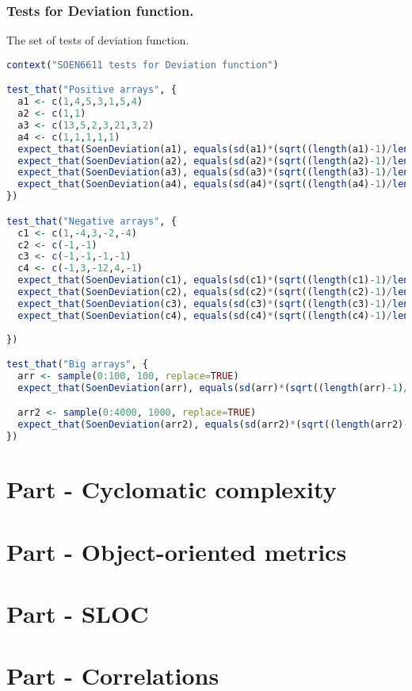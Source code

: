\documentclass[12pt]{article}
\begin{document}
\subsubsection{Tests for Deviation function.}
The set of tests of deviation function.
\begin{lstlisting}[language=R]
context("SOEN6611 tests for Deviation function")

test_that("Positive arrays", {
  a1 <- c(1,4,5,3,1,5,4)
  a2 <- c(1,1)
  a3 <- c(13,5,2,3,21,3,2)
  a4 <- c(1,1,1,1,1)
  expect_that(SoenDeviation(a1), equals(sd(a1)*(sqrt((length(a1)-1)/length(a1)))))
  expect_that(SoenDeviation(a2), equals(sd(a2)*(sqrt((length(a2)-1)/length(a2)))))
  expect_that(SoenDeviation(a3), equals(sd(a3)*(sqrt((length(a3)-1)/length(a3)))))
  expect_that(SoenDeviation(a4), equals(sd(a4)*(sqrt((length(a4)-1)/length(a4)))))
})

test_that("Negative arrays", {
  c1 <- c(1,-4,3,-2,-4)
  c2 <- c(-1,-1)
  c3 <- c(-1,-1,-1,-1)
  c4 <- c(-1,3,-12,4,-1)
  expect_that(SoenDeviation(c1), equals(sd(c1)*(sqrt((length(c1)-1)/length(c1)))))
  expect_that(SoenDeviation(c2), equals(sd(c2)*(sqrt((length(c2)-1)/length(c2)))))
  expect_that(SoenDeviation(c3), equals(sd(c3)*(sqrt((length(c3)-1)/length(c3)))))
  expect_that(SoenDeviation(c4), equals(sd(c4)*(sqrt((length(c4)-1)/length(c4)))))
  
})

test_that("Big arrays", {
  arr <- sample(0:100, 100, replace=TRUE)
  expect_that(SoenDeviation(arr), equals(sd(arr)*(sqrt((length(arr)-1)/length(arr)))))

  arr2 <- sample(0:4000, 1000, replace=TRUE)
  expect_that(SoenDeviation(arr2), equals(sd(arr2)*(sqrt((length(arr2)-1)/length(arr2)))))
})
\end{lstlisting}

\section{Part - Cyclomatic complexity}

\section{Part - Object-oriented metrics}

\section{Part - SLOC}

\section{{Part - Correlations}}

{}

\end{document}

